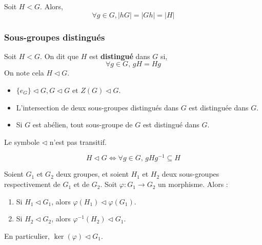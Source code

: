 	\begin{proposition}
		Soit $H < G$. Alors,
		\[ \forall g \in G, \vert hG \vert = \vert Gh \vert = \vert H \vert \]
	\end{proposition}

	\subsubsection{Sous-groupes distingués}


	\begin{definition}
		Soit $H < G$. On dit que $H$ est \textbf{distingué} dans $G$ si,
		\[ \forall g \in G, \, gH = Hg \]
		On note cela $H \lhd G$.
	\end{definition}

	\begin{example}
		\begin{itemize}
			\item $\{ e_G \} \lhd G, G \lhd G \text{ et } Z(G) \lhd G$.
			\item L'intersection de deux sous-groupes distingués dans $G$ est distinguée dans $G$.
			\item Si $G$ est abélien, tout sous-groupe de $G$ est distingué dans $G$.
		\end{itemize}
	\end{example}


	\begin{remark}
		Le symbole $\lhd$ n'est pas transitif.
	\end{remark}

	\begin{proposition}
		\[ H \lhd G \iff \forall g \in G, \, gHg^{-1} \subseteq H \]
	\end{proposition}


	\begin{proposition}
		Soient $G_1$ et $G_2$ deux groupes, et soient $H_1$ et $H_2$ deux sous-groupes respectivement de $G_1$ et de $G_2$. Soit $\varphi : G_1 \rightarrow G_2$ un morphisme. Alors :
		\begin{enumerate}
			\item Si $H_1 \lhd G_1$, alors $\varphi(H_1) \lhd \varphi(G_1)$.
			\item Si $H_2 \lhd G_2$, alors $\varphi^{-1}(H_2) \lhd G_1$.
		\end{enumerate}
		En particulier, $\ker(\varphi) \lhd G_1$.
	\end{proposition}

